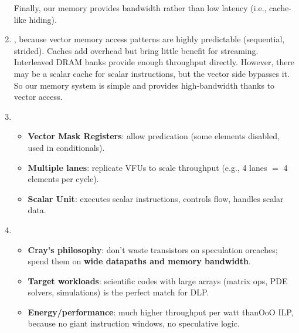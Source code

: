 \begin{enumerate}
    Finally, our memory provides bandwidth rather than low latency (i.e., cache-like hiding).
    \item {}, because vector memory access patterns are highly predictable (sequential, strided). Caches add overhead but bring little benefit for streaming. Interleaved DRAM banks provide enough throughput directly. However, there may be a scalar cache for scalar instructions, but the vector side bypasses it. So our memory system is simple and provides high-bandwidth thanks to vector access.
    \item {}
    \begin{itemize}
        \item \textbf{Vector Mask Registers}: allow predication (some elements disabled, used in conditionals).
        \item \textbf{Multiple lanes}: replicate VFUs to scale throughput (e.g., 4 lanes $=$ 4 elements per cycle).
        \item \textbf{Scalar Unit}: executes scalar instructions, controls flow, handles scalar data.
    \end{itemize}
    
    \newpage
    
    \item {}
    \begin{itemize}
        \item \textbf{Cray's philosophy}: don't waste transistors on speculation or\break caches; spend them on \textbf{wide datapaths and memory bandwidth}.
        \item \textbf{Target workloads}: scientific codes with large arrays (matrix ops, PDE solvers, simulations) is the perfect match for DLP.
        \item \textbf{Energy/performance}: much higher throughput per watt than\break OoO ILP, because no giant instruction windows, no speculative logic.
    \end{itemize}
\end{enumerate}